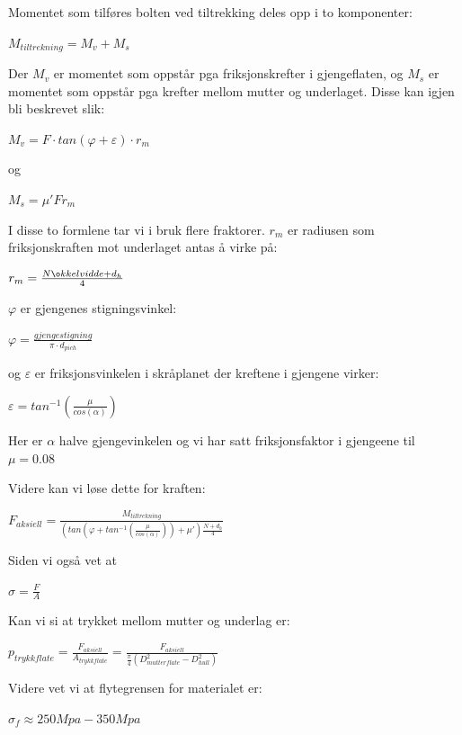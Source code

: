 Momentet som tilføres bolten ved tiltrekking deles opp i to komponenter:
\begin{center}
$M_{tiltrekning}=M_{v}+M_{s}$
\end{center}
Der $M_{v}$ er momentet som oppstår pga friksjonskrefter i gjengeflaten, og $M_{s}$ er momentet som oppstår pga krefter mellom mutter og underlaget. Disse kan igjen bli beskrevet slik:
\begin{center}
$M_{v}=F\cdot tan(\varphi +\varepsilon )\cdot r_{m}$
\end{center}
og
\begin{center}
$M_{s}=\mu 'Fr_{m}$
\end{center}
I disse to formlene tar vi i bruk flere fraktorer. $ r_{m}$ er radiusen som friksjonskraften mot underlaget antas å virke på:
\begin{center}
$r_{m}=\frac{N\o kkelvidde+d_{h}}{4}$
\end{center}
$\varphi$ er gjengenes stigningsvinkel:
\begin{center}
$\varphi =\frac{gjengestigning}{\pi \cdot d_{pich}}$
\end{center}
og $\varepsilon$ er friksjonsvinkelen i skråplanet der kreftene i gjengene virker:
\begin{center}
$\varepsilon =tan^{-1}(\frac{\mu}{cos(\alpha )})$
\end{center}
Her er $\alpha$ halve gjengevinkelen og vi har satt friksjonsfaktor i gjengeene til $\mu=0.08$ \cite{FriksjonsfaktorGjenger} %

Videre kan vi løse dette for kraften:
\begin{center}
$F_{aksiell}=\frac{M_{tiltrekning}}{(tan(\varphi +tan^{-1}(\frac{\mu }{cos(\alpha )}))+\mu')\frac{N+d_{h}}{4}}$
\end{center}
Siden vi også vet at
\begin{center}
$\sigma=\frac{F}{A}$
\end{center}
Kan vi si at trykket mellom mutter og underlag er:
\begin{center}
$p_{trykkflate}=\frac{F_{aksiell}}{A_{trykkflate}}=\frac{F_{aksiell}}{\frac{\pi }{4}(D_{mutterflate}^{2}-D_{hull}^{2})}$
\end{center}
Videre vet vi at flytegrensen for materialet er:

\begin{center}
$\sigma _{f}\approx 250 Mpa-350 Mpa$
\end{center}

